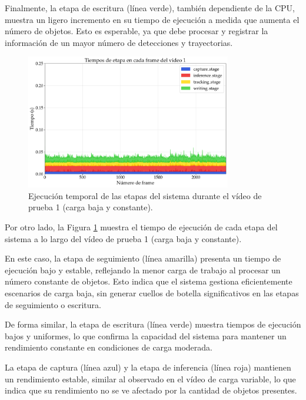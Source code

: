 \documentclass[11pt,spanish,listoffigures,listoftables]{tfgetsinf}
\begin{document}
Finalmente, la etapa de escritura (línea verde), también dependiente de la CPU, muestra un ligero incremento en su tiempo de ejecución a medida que aumenta el número de objetos. Esto es esperable, ya que debe procesar y registrar la información de un mayor número de detecciones y trayectorias.


\begin{figure}[H]
   \centering
   \includegraphics[width=0.8\textwidth]{excels/inferencia/cantidad_objetos/resultados/tiempo_etapa_cada_frame_video1/tiempo_etapa_video1.pdf}
   \caption[Ejecución temporal de las etapas del sistema durante el vídeo de prueba 1 (carga baja y constante)]{Ejecución temporal de las etapas del sistema durante el vídeo de prueba 1 (carga baja y constante).}
   \label{fig:tiempos_etapa_video1}
\end{figure}

Por otro lado, la Figura \ref{fig:tiempos_etapa_video1} muestra el tiempo de ejecución de cada etapa del sistema a lo largo del vídeo de prueba 1 (carga baja y constante).

En este caso, la etapa de seguimiento (línea amarilla) presenta un tiempo de ejecución bajo y estable, reflejando la menor carga de trabajo al procesar un número constante de objetos. Esto indica que el sistema gestiona eficientemente escenarios de carga baja, sin generar cuellos de botella significativos en las etapas de seguimiento o escritura.

De forma similar, la etapa de escritura (línea verde) muestra tiempos de ejecución bajos y uniformes, lo que confirma la capacidad del sistema para mantener un rendimiento constante en condiciones de carga moderada.

La etapa de captura (línea azul) y la etapa de inferencia (línea roja) mantienen un rendimiento estable, similar al observado en el vídeo de carga variable, lo que indica que su rendimiento no se ve afectado por la cantidad de objetos presentes.
\end{document}
